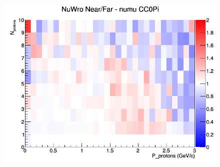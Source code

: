 \begin{figure}[h]
\endminipage
{}
\includegraphics[width=\linewidth]{N_P/nominal/protons/ratios/CC0Pi_NuWro_numu_NF_N_P.png}
\endminipage
\newline
\end{figure}
\clearpage

